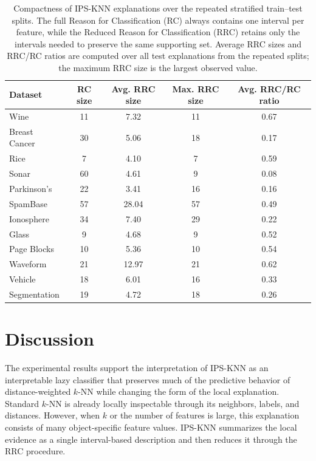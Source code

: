 \documentclass[a4paper,fleqn]{cas-sc}
\begin{document}
\begin{table}[H]
\caption{Compactness of IPS-KNN explanations over the repeated stratified train--test splits. The full Reason for Classification (RC) always contains one interval per feature, while the Reduced Reason for Classification (RRC) retains only the intervals needed to preserve the same supporting set. Average RRC sizes and RRC/RC ratios are computed over all test explanations from the repeated splits; the maximum RRC size is the largest observed value.}
\label{tab:rrc_compactness}
\centering
\begin{tabular}{lcccc}
\toprule
Dataset & RC size & Avg. RRC size & Max. RRC size & Avg. RRC/RC ratio \\
\midrule
Wine & 11 & 7.32 & 11 & 0.67 \\
Breast Cancer & 30 & 5.06 & 18 & 0.17 \\
Rice & 7 & 4.10 & 7 & 0.59 \\
Sonar & 60 & 4.61 & 9 & 0.08 \\
Parkinson's & 22 & 3.41 & 16 & 0.16 \\
SpamBase & 57 & 28.04 & 57 & 0.49 \\
Ionosphere & 34 & 7.40 & 29 & 0.22 \\
Glass & 9 & 4.68 & 9 & 0.52 \\
Page Blocks & 10 & 5.36 & 10 & 0.54 \\
Waveform & 21 & 12.97 & 21 & 0.62 \\
Vehicle & 18 & 6.01 & 16 & 0.33 \\
Segmentation & 19 & 4.72 & 18 & 0.26 \\
\bottomrule
\end{tabular}
\end{table}

\section{Discussion}

The experimental results support the interpretation of IPS-KNN as an interpretable lazy classifier that preserves much of the predictive behavior of distance-weighted \(k\)-NN while changing the form of the local explanation. Standard \(k\)-NN is already locally inspectable through its neighbors, labels, and distances. However, when \(k\) or the number of features is large, this explanation consists of many object-specific feature values. IPS-KNN summarizes the local evidence as a single interval-based description and then reduces it through the RRC procedure.
\end{document}

